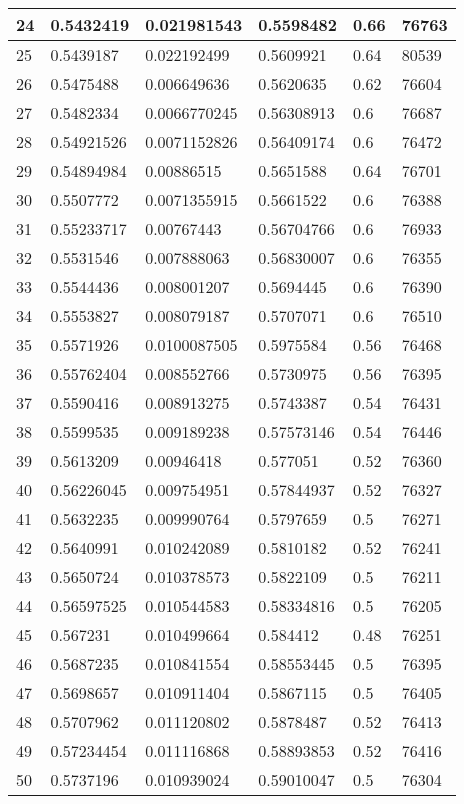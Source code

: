 \begin{longtable}{|l|l|l|l|l|l|}
24 & 0.5432419 & 0.021981543 & 0.5598482 & 0.66 & 76763 \\ \hline 
25 & 0.5439187 & 0.022192499 & 0.5609921 & 0.64 & 80539 \\ \hline 
26 & 0.5475488 & 0.006649636 & 0.5620635 & 0.62 & 76604 \\ \hline 
27 & 0.5482334 & 0.0066770245 & 0.56308913 & 0.6 & 76687 \\ \hline 
28 & 0.54921526 & 0.0071152826 & 0.56409174 & 0.6 & 76472 \\ \hline 
29 & 0.54894984 & 0.00886515 & 0.5651588 & 0.64 & 76701 \\ \hline 
30 & 0.5507772 & 0.0071355915 & 0.5661522 & 0.6 & 76388 \\ \hline 
31 & 0.55233717 & 0.00767443 & 0.56704766 & 0.6 & 76933 \\ \hline 
32 & 0.5531546 & 0.007888063 & 0.56830007 & 0.6 & 76355 \\ \hline 
33 & 0.5544436 & 0.008001207 & 0.5694445 & 0.6 & 76390 \\ \hline 
34 & 0.5553827 & 0.008079187 & 0.5707071 & 0.6 & 76510 \\ \hline 
35 & 0.5571926 & 0.0100087505 & 0.5975584 & 0.56 & 76468 \\ \hline 
36 & 0.55762404 & 0.008552766 & 0.5730975 & 0.56 & 76395 \\ \hline 
37 & 0.5590416 & 0.008913275 & 0.5743387 & 0.54 & 76431 \\ \hline 
38 & 0.5599535 & 0.009189238 & 0.57573146 & 0.54 & 76446 \\ \hline 
39 & 0.5613209 & 0.00946418 & 0.577051 & 0.52 & 76360 \\ \hline 
40 & 0.56226045 & 0.009754951 & 0.57844937 & 0.52 & 76327 \\ \hline 
41 & 0.5632235 & 0.009990764 & 0.5797659 & 0.5 & 76271 \\ \hline 
42 & 0.5640991 & 0.010242089 & 0.5810182 & 0.52 & 76241 \\ \hline 
43 & 0.5650724 & 0.010378573 & 0.5822109 & 0.5 & 76211 \\ \hline 
44 & 0.56597525 & 0.010544583 & 0.58334816 & 0.5 & 76205 \\ \hline 
45 & 0.567231 & 0.010499664 & 0.584412 & 0.48 & 76251 \\ \hline 
46 & 0.5687235 & 0.010841554 & 0.58553445 & 0.5 & 76395 \\ \hline 
47 & 0.5698657 & 0.010911404 & 0.5867115 & 0.5 & 76405 \\ \hline 
48 & 0.5707962 & 0.011120802 & 0.5878487 & 0.52 & 76413 \\ \hline 
49 & 0.57234454 & 0.011116868 & 0.58893853 & 0.52 & 76416 \\ \hline 
50 & 0.5737196 & 0.010939024 & 0.59010047 & 0.5 & 76304 \\ \hline 
\end{longtable}